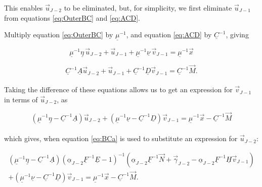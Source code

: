 \documentclass[11pt]{amsart}
\begin{document}
This enables $\vec{u}_{J-2}$ to be eliminated, but, for simplicity, we first eliminate $\vec{u}_{J-1}$ from equations \ref{eq:OuterBC} and \ref{eq:ACD}.

Multiply equation \ref{eq:OuterBC} by $\underline{\mu}^{-1}$, and equation \ref{eq:ACD} by $\underline{C}^{-1}$, giving

\begin{equation} \label{eq:BCb}
\underline{\mu}^{-1}  \underline{\eta} \, \vec{u}_{J-2} + \vec{u}_{J-1} + \underline{\mu}^{-1}  \underline{\nu} \, \vec{v}_{J-1} =  \underline{\mu}^{-1} \vec{x}
\end{equation}

\begin{equation} \label{eq:BCc}
\underline{C}^{-1}  \underline{A} \vec{u}_{J-2}  +  \vec{u}_{J-1}  +  \underline{C}^{-1} \underline{D} \vec{v}_{J-1}  =  \underline{C}^{-1}  \vec{M} .
\end{equation}
\\

Taking the difference of these equations allows us to get an expression for $\vec{v}_{J-1}$ in terms of $\vec{u}_{J-2}$, as

\begin{equation} \label{eq:BCd}
\left(  \underline{\mu}^{-1}  \underline{\eta}   -  \underline{C}^{-1}  \underline{A}  \right) \vec{u}_{J-2}  +  \left(  \underline{\mu}^{-1}  \underline{\nu}   -  \underline{C}^{-1} \underline{D} \right)  \vec{v}_{J-1}  =  \underline{\mu}^{-1} \vec{x}  -  \underline{C}^{-1}  \vec{M} 
\end{equation}
\\

which gives, when equation \ref{eq:BCa} is used to substitute an expression for $\vec{u}_{J-2}$:

\begin{multline} \label{eq:BCe}
\left(  \underline{\mu}^{-1}  \underline{\eta}   -  \underline{C}^{-1}  \underline{A}  \right) \left(  \underline{\alpha}_{J-2} \underline{F}^{-1} \underline{E}  -  1  \right)^{-1}   \left(  \underline{\alpha}_{J-2} \underline{F}^{-1} \vec{N}  +  \vec{\gamma}_{J-2}  -   \underline{\alpha}_{J-2} \underline{F}^{-1} \underline{H} \vec{v}_{J-1}  \right)  \\
+  \left(  \underline{\mu}^{-1}  \underline{\nu}   -  \underline{C}^{-1} \underline{D} \right)  \vec{v}_{J-1}  =  \underline{\mu}^{-1} \vec{x}  -  \underline{C}^{-1}  \vec{M}   .
\end{multline}
\\
\end{document}
